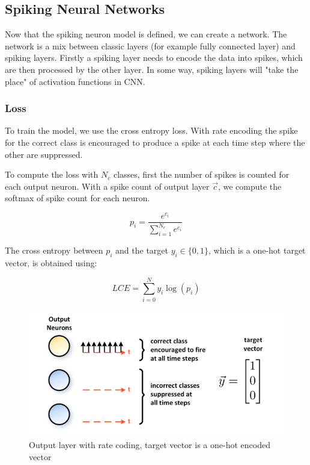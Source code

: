 \documentclass[11pt]{article}
\begin{document}
\subsection{Spiking Neural Networks}



Now that the spiking neuron model is defined, we can create a network. The network is a mix between classic layers (for example fully connected layer) and spiking layers. Firstly a spiking layer needs to encode the data into spikes, which are then processed by the other layer. In some way, spiking layers will "take the place" of activation functions in CNN. 





\hfill


\subsubsection{Loss}
To train the model, we use the cross entropy loss. With rate encoding the spike for the correct class is encouraged to produce a spike at each time step where the other are suppressed. 

To compute the loss with $N_c$ classes, first the number of spikes is counted for each output neuron. With a spike count of output layer $\vec{c}$, we compute the softmax of spike count for each neuron.

$$ p_i = \frac{e^{c_i}}{\sum_{i=1}^{N_c} e^{c_i}} $$ 

The cross entropy between $p_i$ and the target $y_i \in \{0, 1\}$, which is a one-hot target vector, is obtained using:

$$ LCE = \sum_{i=0}^{N} y_i \log(p_i) $$



\begin{figure}[H]
    \centering
    \includegraphics[width=\textwidth]{./image/loss_cross_entropy_snn_train.png}
    \caption{Output layer with rate coding, target vector is a one-hot encoded vector}
    \label{fig:snn_output}
\end{figure}
\end{document}
